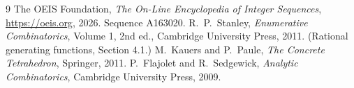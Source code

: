 \documentclass[11pt,a4paper]{article}
\theoremstyle{plain}
\theoremstyle{definition}
\begin{document}
\begin{thebibliography}{9}
 The OEIS Foundation, \emph{The On-Line Encyclopedia of Integer
Sequences}, \url{https://oeis.org}, 2026. Sequence A163020.
 R.~P.~Stanley, \emph{Enumerative Combinatorics}, Volume 1, 2nd ed.,
Cambridge University Press, 2011. (Rational generating functions, Section 4.1.)
 M.~Kauers and P.~Paule, \emph{The Concrete Tetrahedron}, Springer, 2011.
 P.~Flajolet and R.~Sedgewick, \emph{Analytic Combinatorics}, Cambridge
University Press, 2009.
\end{thebibliography}
\end{document}

